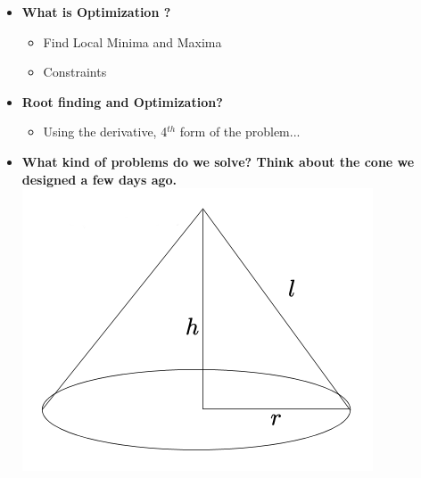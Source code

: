 \documentclass[11pt]{article}
\begin{document}
\begin{itemize}
\Large
	\item \textbf{\LARGE What is Optimization ?}
		\begin{itemize}
			\item Find Local Minima and Maxima \vspace{80mm}	
			\item Constraints	
		\end{itemize}
		\newpage
		
	\item \textbf{\LARGE Root finding and Optimization?}
		\begin{itemize}
			\item Using the derivative, 4$^{th}$ form of the problem... \vspace{80mm}	
	
		\end{itemize}
	\item \textbf{\LARGE What kind of problems do we solve? Think about the cone we designed a few days ago.}	\\
			\includegraphics[scale=.5]{lecture4_fig3.png}\hspace{5mm}
		  \\\\
		  \hspace*{60mm}  \\\\
		
		\newpage


\end{itemize}
\end{document}
